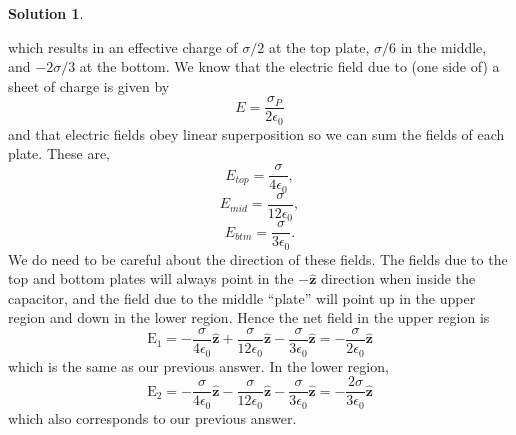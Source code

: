 \documentclass[10pt]{article}
\theoremstyle{definition}
\newtheorem{soln}{Solution}
\newcommand{\uz}{\hat{\mathbf{z}}}
\newcommand{\bv}[1]{\bm{\mathrm{#1}}}
\begin{document}
\begin{soln}
\begin{enumerate}[label=(\alph*)]
\begin{center}
          \end{center}
          which results in an effective charge of $\sigma/2$ at the top plate, $\sigma/6$ in the middle, and $-2\sigma/3$ at the bottom. We know that the electric field due to 
          (one side of) a sheet of charge is given by $$E=\frac{\sigma_P}{2\epsilon_0}$$
          and that electric fields obey linear superposition so we can sum the fields of each plate. These are,
          $$E_{top}=\frac{\sigma}{4\epsilon_0},$$
          $$E_{mid}=\frac{\sigma}{12\epsilon_0},$$
          $$E_{btm}=\frac{\sigma}{3\epsilon_0}.$$
          We do need to be careful about the direction of these fields. The fields due to the top and bottom plates will always point in the $-\uz$ direction when 
          inside the capacitor, and the field due to the middle ``plate'' will point up in the upper region and down in the lower region. Hence the net field in the upper
          region is 
          $$\bv{E}_1=-\frac{\sigma}{4\epsilon_0}\uz+\frac{\sigma}{12\epsilon_0}\uz-\frac{\sigma}{3\epsilon_0}\uz=-\frac{\sigma}{2\epsilon_0}\uz$$
          which is the same as our previous answer. In the lower region,
          $$\bv{E}_2=-\frac{\sigma}{4\epsilon_0}\uz-\frac{\sigma}{12\epsilon_0}\uz-\frac{\sigma}{3\epsilon_0}\uz=-\frac{2\sigma}{3\epsilon_0}\uz$$
          which also corresponds to our previous answer.
  \end{enumerate}
\end{soln}
\end{document}
